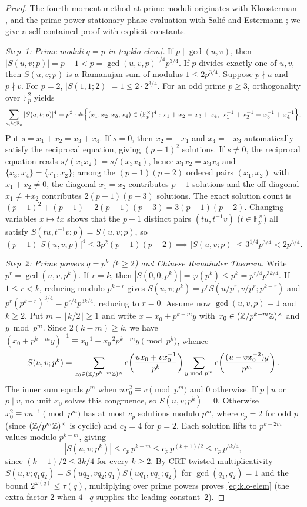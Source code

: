 \documentclass[11pt]{article}
\begin{document}
\begin{proof}
The fourth-moment method at prime moduli originates with Kloosterman \cite{Kloosterman1926}, and the prime-power stationary-phase evaluation with Sali\'e \cite{Salie1931} and Estermann \cite{Estermann1961}; we give a self-contained proof with explicit constants.

\emph{Step~1: Prime moduli $q=p$ in \eqref{eq:klo-elem}.}
If $p\mid\gcd(u,v)$, then $|S(u,v;p)|=p-1<p=\gcd(u,v,p)^{1/4}p^{3/4}$. If $p$ divides exactly one of $u,v$, then $S(u,v;p)$ is a Ramanujan sum of modulus $1\le 2p^{3/4}$. Suppose $p\nmid u$ and $p\nmid v$. For $p=2$, $|S(1,1;2)|=1\le 2\cdot 2^{3/4}$. For an odd prime $p\ge3$, orthogonality over $\mathbb{F}_p^2$ yields
\[
\sum_{a,b\in\mathbb{F}_p}|S(a,b;p)|^4=p^2\cdot\#\Bigl\{(x_1,x_2,x_3,x_4)\in(\mathbb{F}_p^\times)^4:x_1+x_2=x_3+x_4,\ x_1^{-1}+x_2^{-1}=x_3^{-1}+x_4^{-1}\Bigr\}.
\]
Put $s=x_1+x_2=x_3+x_4$. If $s=0$, then $x_2=-x_1$ and $x_4=-x_3$ automatically satisfy the reciprocal equation, giving $(p-1)^2$ solutions. If $s\ne0$, the reciprocal equation reads $s/(x_1x_2)=s/(x_3x_4)$, hence $x_1x_2=x_3x_4$ and $\{x_3,x_4\}=\{x_1,x_2\}$; among the $(p-1)(p-2)$ ordered pairs $(x_1,x_2)$ with $x_1+x_2\ne0$, the diagonal $x_1=x_2$ contributes $p-1$ solutions and the off-diagonal $x_1\ne\pm x_2$ contributes $2(p-1)(p-3)$ solutions. The exact solution count is $(p-1)^2+(p-1)+2(p-1)(p-3)=3(p-1)(p-2)$. Changing variables $x\mapsto tx$ shows that the $p-1$ distinct pairs $(tu,t^{-1}v)$ ($t\in\mathbb{F}_p^\times$) all satisfy $S(tu,t^{-1}v;p)=S(u,v;p)$, so
\[
(p-1)|S(u,v;p)|^4\le 3p^2(p-1)(p-2)\implies |S(u,v;p)|\le 3^{1/4}p^{3/4}<2p^{3/4}.
\]

\emph{Step~2: Prime powers $q=p^k$ ($k\ge2$) and Chinese Remainder Theorem.}
Write $p^r=\gcd(u,v,p^k)$. If $r=k$, then $|S(0,0;p^k)|=\varphi(p^k)\le p^k=p^{r/4}p^{3k/4}$. If $1\le r<k$, reducing modulo $p^{k-r}$ gives $S(u,v;p^k)=p^r S(u/p^r,v/p^r;p^{k-r})$ and $p^r(p^{k-r})^{3/4}=p^{r/4}p^{3k/4}$, reducing to $r=0$. Assume now $\gcd(u,v,p)=1$ and $k\ge2$. Put $m=\lfloor k/2\rfloor\ge1$ and write $x=x_0+p^{k-m}y$ with $x_0\in(\mathbb Z/p^{k-m}\mathbb Z)^\times$ and $y\bmod p^m$. Since $2(k-m)\ge k$, we have $(x_0+p^{k-m}y)^{-1}\equiv x_0^{-1}-x_0^{-2}p^{k-m}y\pmod{p^k}$, whence
\[
S(u,v;p^k)=\sum_{x_0\in(\mathbb Z/p^{k-m}\mathbb Z)^\times}e\!\left(\frac{ux_0+vx_0^{-1}}{p^k}\right)\sum_{y\bmod p^m}e\!\left(\frac{(u-vx_0^{-2})y}{p^m}\right).
\]
The inner sum equals $p^m$ when $ux_0^2\equiv v\pmod{p^m}$ and $0$ otherwise. If $p\mid u$ or $p\mid v$, no unit $x_0$ solves this congruence, so $S(u,v;p^k)=0$. Otherwise $x_0^2\equiv vu^{-1}\pmod{p^m}$ has at most $c_p$ solutions modulo $p^m$, where $c_p=2$ for odd $p$ (since $(\mathbb Z/p^m\mathbb Z)^\times$ is cyclic) and $c_2=4$ for $p=2$. Each solution lifts to $p^{k-2m}$ values modulo $p^{k-m}$, giving
\[
|S(u,v;p^k)|\le c_p\,p^{k-m}\le c_p\,p^{(k+1)/2}\le c_p\,p^{3k/4},
\]
since $(k+1)/2\le 3k/4$ for every $k\ge2$. By CRT twisted multiplicativity $S(u,v;q_1q_2)=S(u\bar q_2,v\bar q_2;q_1)S(u\bar q_1,v\bar q_1;q_2)$ for $\gcd(q_1,q_2)=1$ and the bound $2^{\omega(q)}\le\tau(q)$, multiplying over prime powers proves \eqref{eq:klo-elem} (the extra factor $2$ when $4\mid q$ supplies the leading constant~$2$).


\end{proof}
\end{document}

